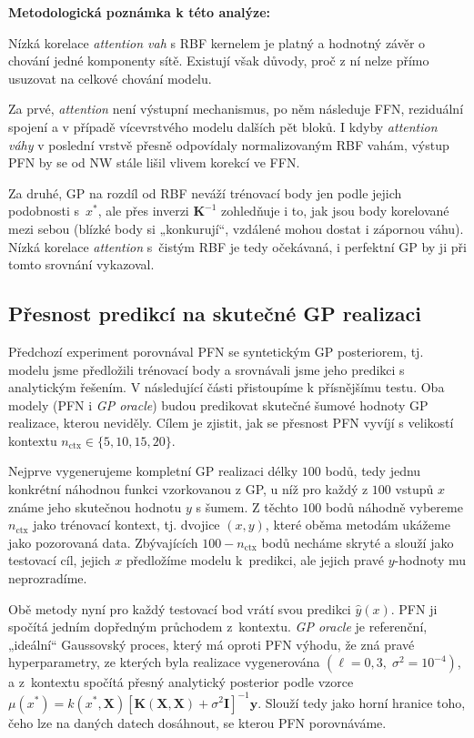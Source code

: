 \textbf{Metodologická poznámka k této analýze:}

Nízká korelace \emph{attention vah} s RBF kernelem je platný a hodnotný závěr o chování jedné komponenty sítě.
Existují však důvody, proč z ní nelze přímo usuzovat na celkové chování modelu.

Za prvé, \emph{attention} není výstupní mechanismus, po něm následuje FFN, reziduální spojení a v případě vícevrstvého modelu dalších pět bloků.
I kdyby \emph{attention váhy} v poslední vrstvě přesně odpovídaly normalizovaným RBF vahám, výstup PFN by se od NW stále lišil vlivem korekcí ve FFN.

Za druhé, GP na rozdíl od RBF neváží trénovací body jen podle jejich podobnosti s~$x^*$, ale přes inverzi $\mathbf{K}^{-1}$ zohledňuje i to, jak jsou body korelované mezi sebou (blízké body si „konkurují“, vzdálené mohou dostat i zápornou váhu).
Nízká korelace \emph{attention} s~čistým RBF je tedy očekávaná, i perfektní GP by ji při tomto srovnání vykazoval.

\subsection{Přesnost predikcí na skutečné GP realizaci}
\label{subsec:presnost-pfn}

Předchozí experiment porovnával PFN se syntetickým GP posteriorem, tj. modelu jsme předložili trénovací body a srovnávali jsme jeho predikci s analytickým řešením.
V následující části přistoupíme k přísnějšímu testu.
Oba modely (PFN i \emph{GP oracle}) budou predikovat skutečné šumové hodnoty GP realizace, kterou neviděly.
Cílem je zjistit, jak se přesnost PFN vyvíjí s velikostí kontextu $n_{\text{ctx}} \in \{5, 10, 15, 20\}$.
\par

Nejprve vygenerujeme kompletní GP realizaci délky $100$ bodů, tedy jednu konkrétní náhodnou funkci vzorkovanou z GP, u níž pro každý z $100$ vstupů $x$ známe jeho skutečnou hodnotu $y$ s šumem.
Z těchto $100$ bodů náhodně vybereme $n_{\text{ctx}}$ jako trénovací kontext, tj. dvojice $(x, y)$, které oběma metodám ukážeme jako pozorovaná data.
Zbývajících $100 - n_{\text{ctx}}$ bodů necháme skryté a slouží jako testovací cíl, jejich $x$ předložíme modelu k~predikci, ale jejich pravé $y$-hodnoty mu neprozradíme.

Obě metody nyní pro každý testovací bod vrátí svou predikci $\hat{y}(x)$.
PFN ji spočítá jedním dopředným průchodem z~kontextu.
\emph{GP oracle} je referenční, „ideální“ Gaussovský proces, který má oproti PFN výhodu, že zná pravé hyperparametry, ze kterých byla realizace vygenerována $(\ell = 0{,}3,\; \sigma^2 = 10^{-4})$, a z~kontextu spočítá přesný analytický posterior podle vzorce $\mu(x^*) = k(x^*, \mathbf{X})[\mathbf{K}(\mathbf{X},\mathbf{X}) + \sigma^2 \mathbf{I}]^{-1} \mathbf{y}$.
Slouží tedy jako horní hranice toho, čeho lze na daných datech dosáhnout, se kterou PFN porovnáváme.

